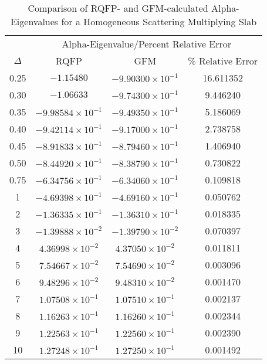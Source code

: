 \begin{table*}[!htbp]
\centering{}
\caption{Comparison of RQFP- and GFM-calculated Alpha-Eigenvalues for a Homogeneous Scattering Multiplying Slab}
\label{table:CompHomogMult}
\begin{tabular}{@{}cccc@{}}\toprule
& \multicolumn{3}{c}{Alpha-Eigenvalue/Percent Relative Error} \\
\cmidrule{2-4} $\Delta$ & RQFP & GFM & \% Relative Error \\
\midrule
0.25 & $-1.15480 $ & $-9.90300 \times 10^{-1}$ & 16.611352 \\ 
0.30 & $-1.06633 $ & $-9.74300 \times 10^{-1}$ & 9.446240 \\ 
0.35 & $-9.98584 \times 10^{-1}$ & $-9.49350 \times 10^{-1}$ & 5.186069 \\ 
0.40 & $-9.42114 \times 10^{-1}$ & $-9.17000 \times 10^{-1}$ & 2.738758 \\ 
0.45 & $-8.91833 \times 10^{-1}$ & $-8.79460 \times 10^{-1}$ & 1.406940 \\ 
0.50 & $-8.44920 \times 10^{-1}$ & $-8.38790 \times 10^{-1}$ & 0.730822 \\ 
0.75 & $-6.34756 \times 10^{-1}$ & $-6.34060 \times 10^{-1}$ & 0.109818 \\ 
1 & $-4.69398 \times 10^{-1}$ & $-4.69160 \times 10^{-1}$ & 0.050762 \\ 
2 & $-1.36335 \times 10^{-1}$ & $-1.36310 \times 10^{-1}$ & 0.018335 \\ 
3 & $-1.39888 \times 10^{-2}$ & $-1.39790 \times 10^{-2}$ & 0.070397 \\ 
4 & $4.36998 \times 10^{-2}$ & $4.37050 \times 10^{-2}$ & 0.011811 \\ 
5 & $7.54667 \times 10^{-2}$ & $7.54690 \times 10^{-2}$ & 0.003096 \\ 
6 & $9.48296 \times 10^{-2}$ & $9.48310 \times 10^{-2}$ & 0.001470 \\ 
7 & $1.07508 \times 10^{-1}$ & $1.07510 \times 10^{-1}$ & 0.002137 \\ 
8 & $1.16263 \times 10^{-1}$ & $1.16260 \times 10^{-1}$ & 0.002344 \\ 
9 & $1.22563 \times 10^{-1}$ & $1.22560 \times 10^{-1}$ & 0.002390 \\ 
10 & $1.27248 \times 10^{-1}$ & $1.27250 \times 10^{-1}$ & 0.001492 \\ 

\end{tabular}
\end{table*}
